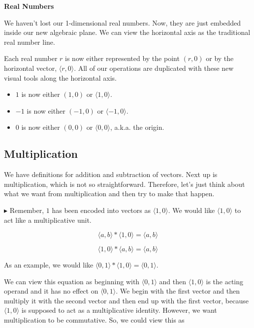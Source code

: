 \documentclass{ximera}
\begin{document}
\textbf{Real Numbers}



We haven't lost our 1-dimensional real numbers. Now, they are just embedded inside our new algebraic plane.  We can view the horizontal axis as the traditional real number line.

Each real number $r$ is now either represented by the point $(r,0)$ or by the horizontal vector, $\langle r, 0 \rangle$.  All of our operations are duplicated with these new visual tools along the horizontal axis.


\begin{itemize}
\item $1$ is now either $(1,0)$ or $\langle 1, 0 \rangle$.
\item $-1$ is now either $(-1,0)$ or $\langle -1, 0 \rangle$.
\item $0$ is now either $(0,0)$ or $\langle 0, 0 \rangle$, a.k.a. the origin.
\end{itemize}














\subsection{Multiplication}



We have definitions for addition and subtraction of vectors.  Next up is multiplication, which is not so straightforward.  Therefore, let's just think about what we want from multiplication and then try to make that happen.

\textbf{\textcolor{red!90!darkgray}{$\blacktriangleright$}} Remember, $1$ has been encoded into vectors as $\langle 1, 0 \rangle$.  We would like $\langle 1, 0 \rangle$ to act like a multiplicative unit.

\[    \langle a, b \rangle * \langle 1, 0 \rangle    = \langle a, b \rangle            \]

\[    \langle 1, 0 \rangle * \langle a, b \rangle    = \langle a, b \rangle            \]


As an example, we would like $\langle 0, 1 \rangle * \langle 1, 0 \rangle    = \langle 0, 1 \rangle $.

We can view this equation as beginning with $\langle 0, 1 \rangle$ and then $\langle 1, 0 \rangle$ is the acting operand and it has no effect on $\langle 0, 1 \rangle$.  We begin with the first vector and then multiply it with the second vector and then end up with the first vector, because $\langle 1, 0 \rangle$ is supposed to act as a multiplicative identity. However, we want multiplication to be commutative.  So, we could view this as 
\end{document}
